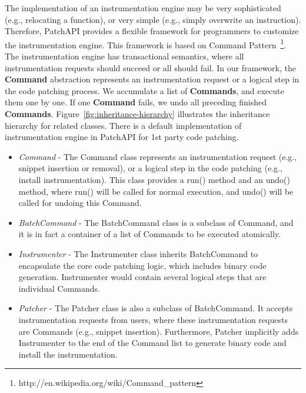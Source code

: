 The implementation of an instrumentation engine may be very sophisticated (e.g.,
relocating a function), or very simple (e.g., simply overwrite an
instruction). Therefore, PatchAPI provides a flexible framework for programmers
to customize the instrumentation engine. This framework is based on Command
Pattern~\footnote{http://en.wikipedia.org/wiki/Command\_pattern}. The
instrumentation engine has transactional semantics, where all instrumentation
requests should succeed or all should fail. In our framework, the
\textbf{Command} abstraction represents an instrumentation request or a logical
step in the code patching process. We accumulate a list of \textbf{Commands},
and execute them one by one. If one \textbf{Command} fails, we undo all
preceding finished \textbf{Commands}. Figure~\ref{fig:inheritance-hierarchy} illustrates the
inheritance hierarchy for related classes. There is a default implementation of
instrumentation engine in PatchAPI for 1st party code patching.

\begin{itemize}
\item \emph{Command} - The Command class represents an instrumentation request (e.g.,
    snippet insertion or removal), or a logical step in the code patching (e.g.,
    install instrumentation). This class provides a run() method and an undo()
    method, where run() will be called for normal execution, and undo() will be
    called for undoing this Command.
\item \emph{BatchCommand} - The BatchCommand class is a subclass of Command, and it is
    in fact a container of a list of Commands to be executed atomically.
\item \emph{Instrumenter} - The Instrumenter class inherits BatchCommand to encapsulate
    the core code patching logic, which includes binary code generation.
    Instrumenter would contain several logical steps that are individual
    Commands.
\item \emph{Patcher} - The Patcher class is also a subclass of BatchCommand. It accepts
    instrumentation requests from users, where these instrumentation requests
    are Commands (e.g., snippet insertion). Furthermore, Patcher implicitly adds
    Instrumenter to the end of the Command list to generate binary code and
    install the instrumentation.
\end{itemize}
